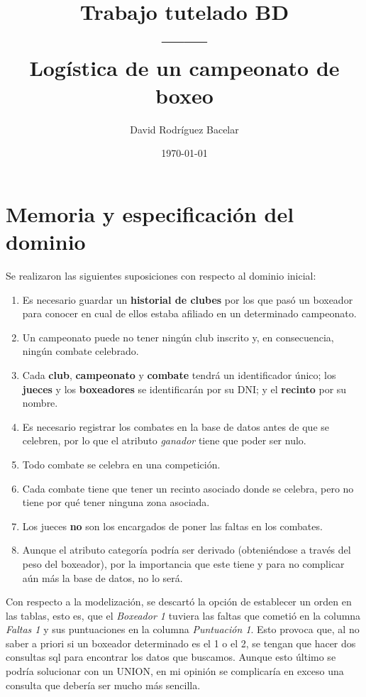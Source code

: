 \documentclass{article}
\title{\textbf{Trabajo tutelado BD \\ ------ \\ Logística de un campeonato de boxeo}}
\author{David Rodríguez Bacelar}
\date{\today}
\begin{document}
\maketitle

\section{Memoria y especificación del dominio}
Se realizaron las siguientes suposiciones con respecto al dominio inicial:
\begin{enumerate}
	\item Es necesario guardar un \textbf{historial de clubes} por los que pasó un boxeador para
		conocer en cual de ellos estaba afiliado en un determinado campeonato.
	\item Un campeonato puede no tener ningún club inscrito y, en consecuencia, ningún combate celebrado.
	\item Cada \textbf{club}, \textbf{campeonato} y \textbf{combate} tendrá un identificador único; los \textbf{jueces} y 
		los \textbf{boxeadores} se identificarán por su DNI; y el \textbf{recinto} por su nombre.
	\item Es necesario registrar los combates en la base de datos antes de que se celebren, por lo que el atributo \textit{ganador}
		tiene que poder ser nulo.
	\item Todo combate se celebra en una competición.
	\item Cada combate tiene que tener un recinto asociado donde se celebra, pero no tiene por qué tener ninguna zona asociada.
	\item Los jueces \textbf{no} son los encargados de poner las faltas en los combates.
	\item Aunque el atributo categoría podría ser derivado (obteniéndose a través del peso del boxeador), por la importancia que este tiene
		y para no complicar aún más la base de datos, no lo será.
\end{enumerate}

\smallskip
Con respecto a la modelización, se descartó la opción de establecer un orden en las tablas, esto es, que el \textit{Boxeador 1} tuviera las faltas
que cometió en la columna \textit{Faltas 1} y sus puntuaciones en la columna \textit{Puntuación 1}. Esto provoca que, al no saber a 
priori si un boxeador determinado es el 1 o el 2, se tengan que hacer dos consultas sql para encontrar los datos que buscamos.
Aunque esto último se podría solucionar con un UNION, en mi opinión se complicaría en exceso una consulta que debería ser mucho más sencilla.
\end{document}
